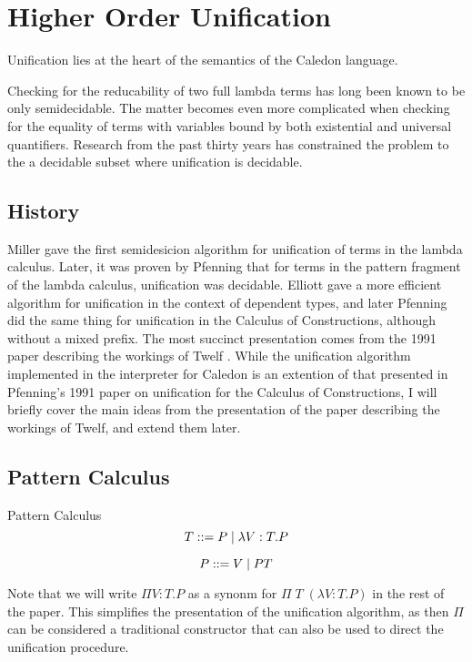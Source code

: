 \section{Higher Order Unification}

Unification lies at the heart of the semantics of the Caledon language.

Checking for the reducability of two full lambda terms has long been known to be only semidecidable.  
The matter becomes even more complicated when checking for the equality of terms with variables bound
by both existential and universal quantifiers.  Research from the past thirty years has constrained
the problem to the a decidable subset where unification is decidable. 


\subsection{History}

Miller \citep{miller1986higher} gave the first semidesicion algorithm for unification of 
terms in the lambda calculus.  
Later, it was proven by Pfenning \citep{pfenning1988partial} \citep{pfenning1988higher} 
that for terms in the pattern fragment of the lambda calculus, unification was decidable.  
Elliott\citep{elliott1989higher} gave a more efficient algorithm for unification in the context 
of dependent types, and later Pfenning \citep{pfenning1991unification}
did the same thing for unification in the Calculus of Constructions, although without a mixed prefix.  
The most succinct presentation comes from the 1991 paper describing the workings of Twelf 
\citep{pfenning1991logic}.  While the unification algorithm implemented in the interpreter for Caledon is 
an extention of that presented in Pfenning's 1991 paper on unification for 
the Calculus of Constructions\citep{pfenning1991unification}, 
I will briefly cover the main ideas from the presentation of the paper describing the workings of Twelf, 
and extend them later.

\subsection{Pattern Calculus}

\begin{definition}
Pattern Calculus
\[
T ::= P
   \; | \; \lambda V : T . P 
\]

\[
P ::= V 
  \; | \; P T 
\]
\end{definition}

Note that we will write $\Pi V : T . P$ as a synonm for $\Pi\; T \; (\lambda V : T . P)$ in the rest of the paper.
This simplifies the presentation of the unification algorithm, as then $\Pi$ can be considered a traditional constructor
that can also be used to direct the unification procedure.

